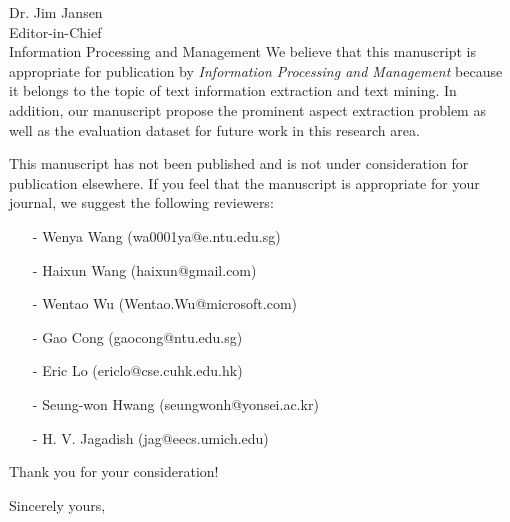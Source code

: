 \documentclass[11pt]{letter} %
\begin{document}
\begin{letter}{Dr. Jim Jansen \\
Editor-in-Chief  \\
Information Processing and Management}
 We believe that this manuscript is appropriate for publication by
 \textit{Information Processing and Management}
because it belongs to the topic of text information extraction and 
text mining. 
In addition, our manuscript propose the prominent
aspect extraction problem as well as the evaluation dataset for
future work in this research area.

This manuscript has not been published and is not under
consideration for publication elsewhere. 
If you feel that the manuscript is appropriate for your journal, 
we suggest the following reviewers: 
\begin{enumerate}
	\item[-] Wenya Wang (wa0001ya@e.ntu.edu.sg)
	\item[-] Haixun Wang (haixun@gmail.com)
	\item[-] Wentao Wu (Wentao.Wu@microsoft.com)
	\item[-] Gao Cong (gaocong@ntu.edu.sg)
	\item[-] Eric Lo (ericlo@cse.cuhk.edu.hk)
	\item[-] Seung-won Hwang (seungwonh@yonsei.ac.kr)
	\item[-] H. V. Jagadish (jag@eecs.umich.edu)
\end{enumerate}

Thank you for your consideration!

\closing{Sincerely yours,}




\end{letter}
\end{document}
